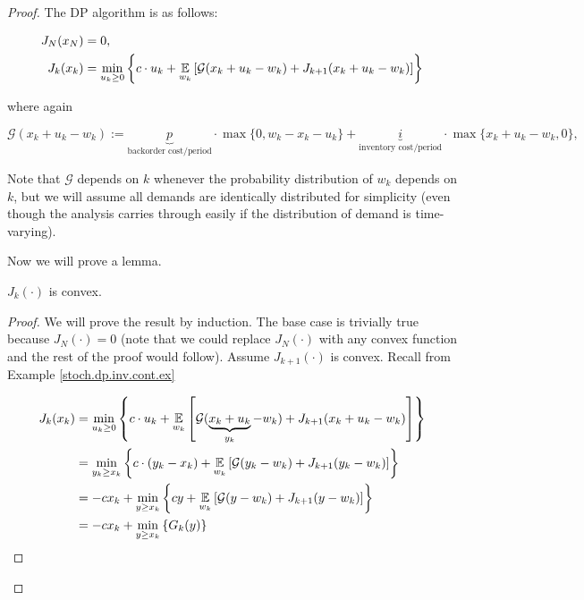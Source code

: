 \begin{proof} 

The DP algorithm is as follows:

\begin{align*}
J_N(x_N) & = 0,
\\ J_k(x_k) & = \min_{u_k \geq 0} \left\{ c \cdot u_k + \underset{w_k}{\mathbb{E}} \left[ \mathcal{G}(x_k + u_k - w_k)  + J_{k+1}(x_k + u_k - w_k ) \right] \right\} 
\end{align*}

where again

\[
\mathcal{G}(x_k +  u_k -  w_k) := \underbrace{p}_{\text{backorder cost/period}} \cdot \max\{0, w_k - x_k - u_k\} +  \underbrace{i}_{\text{inventory cost/period}} \cdot \max\{x_k + u_k - w_k, 0\},
\]

Note that \(\mathcal{G}\) depends on \(k\) whenever the probability distribution of \(w_k\) depends on \(k\), but we will assume all demands are identically distributed for simplicity (even though the analysis carries through easily if the distribution of demand is time-varying).





Now we will prove a lemma.

\begin{lemma}

\(J_k(\cdot)\) is convex.

\end{lemma}

\begin{proof}

We will prove the result by induction. The base case is trivially true because \(J_N(\cdot) = 0\) (note that we could replace \(J_N(\cdot)\) with any convex function and the rest of the proof would follow). Assume \(J_{k+1}(\cdot)\) is convex. Recall from Example \ref{stoch.dp.inv.cont.ex}

\begin{align}
J_k(x_k) & = \min_{u_k \geq 0} \left\{ c \cdot u_k + \underset{w_k}{\mathbb{E}} \left[ \mathcal{G}(\underbrace{x_k + u_k}_{y_k} - w_k)  + J_{k+1}(x_k + u_k - w_k ) \right] \right\} \nonumber \\
& = \min_{y_k \geq x_k} \left\{ c \cdot (y_k - x_k) + \underset{w_k}{\mathbb{E}} \left[ \mathcal{G}(y_k - w_k)  + J_{k+1}(y_k - w_k ) \right] \right\} \nonumber \\
& = -c x_k +  \min_{y \geq x_k} \left\{ c  y  + \underset{w_k}{\mathbb{E}} \left[ \mathcal{G}(y - w_k)  + J_{k+1}(y - w_k ) \right] \right\} \nonumber \\
& = -c x_k +  \min_{y \geq x_k} \left\{ G_k(y) \right\} \label{inv.cont.ctg}
\end{align}


\end{proof}
\end{proof}
